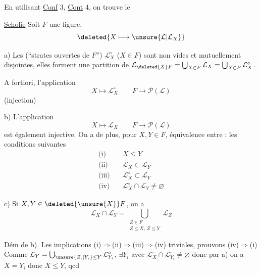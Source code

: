  En utilisant \uline{Conf} 3, \uline{Cont} 4, on trouve le

\uline{Scholie} Soit $F$  une figure. 
\[
\deleted{X\longmapsto\unsure{\mathcal{L}|\mathcal{L}_X}}
\]

a) Les   (``strates ouvertes de $F$'') $\mathcal{L}_X^{\circ}$ ($X\in F$) sont non vides et mutuellement disjointes, elles forment  une partition de $\mathcal{L}_{\deleted{X}F}=\bigcup_{X\in F}\mathcal{L}_X=\bigcup_{X\in F}\mathcal{L}_X^{\circ}$.

 A fortiori, l'application
\[
 X\longmapsto \mathcal{L}_X^{\circ}\qquad F\longrightarrow\mathcal P(\mathcal{L})
\]
(injection)

b) L'application
\[
 X\longmapsto \mathcal{L}_X\qquad F\longrightarrow\mathcal P(\mathcal{L})
\]
est également injective. \inserted{[donc si $X,Y$ sont comp. et $\mathcal{L}_X=\mathcal{L}_Y$ on a $X=Y$)} On a de plus, pour $X,Y\in F$, équivalence entre : les conditions suivantes
\[
\begin{aligned}
 \text{(i)}\quad &X\leq Y\\
 \text{(ii)}\quad &\mathcal{L}_X\subset \mathcal{L}_Y\\
 \text{(iii)}\quad &\mathcal{L}_X^{\circ}\subset \mathcal{L}_Y\\
 \text{(iv)}\quad &\mathcal{L}_X^{\circ}\cap \mathcal{L}_Y\ne\varnothing
\end{aligned}
\]

c) Si $X,Y\in\deleted{\unsure{X}}F$, on a
\[
 \mathcal{L}_X\cap \mathcal{L}_Y=\bigcup_{\substack{Z\in F\\ Z\leq X,\,Z\leq Y}}\mathcal{L}_Z
\]

Dém de b). Les implications (i)$\Rightarrow$(ii)$\Rightarrow$(iii)$\Rightarrow$(iv) triviales, prouvons (iv)$\Rightarrow$(i) Comme $\mathcal{L}_Y=\bigcup_{\unsure{Z_i|Y_i}\leq Y} \mathcal{L}_{Y_i}^{\circ}$,  $\exists Y_i$ avec $\mathcal{L}_X^{\circ}\cap \mathcal{L}_{Y_i}^{\circ}\ne\varnothing$ donc par a) on a $X=Y_i$ donc $X\leq Y$, qcd
